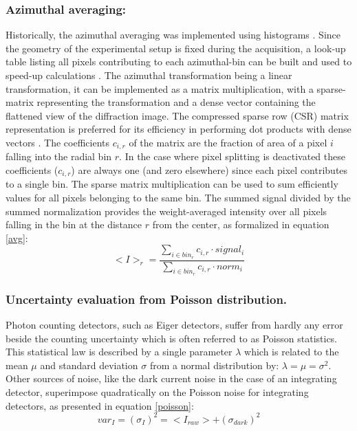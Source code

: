 \documentclass[preprint]{iucr}              %
\begin{document}
\subsubsection{Azimuthal averaging:} 

Historically, the azimuthal averaging was implemented using histograms \cite{fit2d1996}.
Since the geometry of the experimental setup is fixed during the acquisition, a look-up table listing all pixels contributing to each  azimuthal-bin can be built and used to speed-up calculations \cite{pyFAI_gpu}.
The azimuthal transformation being a linear transformation, it can be implemented as a matrix multiplication, with a sparse-matrix representing the transformation and a dense vector containing the flattened view of the diffraction image. 
The compressed sparse row (CSR) matrix representation is preferred for its efficiency in performing dot products with dense vectors \cite{SpMV}.
The coefficients $c_{i,r}$ of the matrix are the fraction of area of a pixel $i$ falling into the radial bin $r$.
In the case where pixel splitting is deactivated these coefficients  ($c_{i,r}$) are always one (and zero elsewhere) since each pixel contributes to a single bin.
The sparse matrix multiplication can be used to sum efficiently values for all pixels belonging to the same bin.
The summed signal divided by the summed normalization provides the weight-averaged intensity over all pixels falling in the bin at the distance $r$ from the center, as formalized in equation \ref{avg}: 
\begin{equation}
\label{avg}
<I>_{r} = \frac{\sum\limits_{i \in bin_r} c_{i,r} \cdot signal_i}
                        {\sum\limits_{i \in bin_r} c_{i,r} \cdot norm_i} 
\end{equation}  

\subsubsection{Uncertainty evaluation from Poisson distribution.}
Photon counting detectors, such as Eiger detectors, suffer from hardly any error beside the counting uncertainty which is often referred to as Poisson statistics.
This statistical law is described by a single parameter $\lambda$ which is related to the mean $\mu$ and standard deviation $\sigma$ from a normal distribution by: $\lambda=\mu=\sigma^2$.
Other sources of noise, like the dark current noise in the case of an integrating detector,  superimpose quadratically on the Poisson noise for integrating detectors, as presented in equation \ref{poisson}:     
\begin{equation}
\label{poisson}
var_I = (\sigma_I)^{2} = <I_{raw}> + (\sigma_{dark})^{2}  
\end{equation}
\end{document}
